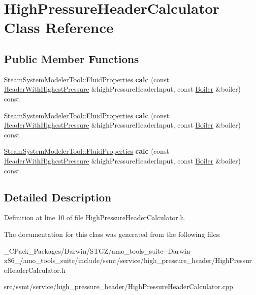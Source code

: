\hypertarget{class_high_pressure_header_calculator}{}\section{High\+Pressure\+Header\+Calculator Class Reference}
\label{class_high_pressure_header_calculator}
\subsection*{Public Member Functions}
\begin{DoxyCompactItemize}
\item 
\mbox{\label{class_high_pressure_header_calculator_a2929b3c87e8db8e1b43363b5234e5054}} 
\hyperlink{struct_steam_system_modeler_tool_1_1_fluid_properties}{Steam\+System\+Modeler\+Tool\+::\+Fluid\+Properties} {\bfseries calc} (const \hyperlink{class_header_with_highest_pressure}{Header\+With\+Highest\+Pressure} \&high\+Pressure\+Header\+Input, const \hyperlink{class_boiler}{Boiler} \&boiler) const
\item 
\mbox{\label{class_high_pressure_header_calculator_a2929b3c87e8db8e1b43363b5234e5054}} 
\hyperlink{struct_steam_system_modeler_tool_1_1_fluid_properties}{Steam\+System\+Modeler\+Tool\+::\+Fluid\+Properties} {\bfseries calc} (const \hyperlink{class_header_with_highest_pressure}{Header\+With\+Highest\+Pressure} \&high\+Pressure\+Header\+Input, const \hyperlink{class_boiler}{Boiler} \&boiler) const
\item 
\mbox{\label{class_high_pressure_header_calculator_a2929b3c87e8db8e1b43363b5234e5054}} 
\hyperlink{struct_steam_system_modeler_tool_1_1_fluid_properties}{Steam\+System\+Modeler\+Tool\+::\+Fluid\+Properties} {\bfseries calc} (const \hyperlink{class_header_with_highest_pressure}{Header\+With\+Highest\+Pressure} \&high\+Pressure\+Header\+Input, const \hyperlink{class_boiler}{Boiler} \&boiler) const
\end{DoxyCompactItemize}


\subsection{Detailed Description}


Definition at line 10 of file High\+Pressure\+Header\+Calculator.\+h.



The documentation for this class was generated from the following files\+:\begin{DoxyCompactItemize}
\item 
\+\_\+\+C\+Pack\+\_\+\+Packages/\+Darwin/\+S\+T\+G\+Z/amo\+\_\+tools\+\_\+suite-\/-\/\+Darwin-\/x86\+\_/amo\+\_\+tools\+\_\+suite/include/ssmt/service/high\+\_\+pressure\+\_\+header/High\+Pressure\+Header\+Calculator.\+h\item 
src/ssmt/service/high\+\_\+pressure\+\_\+header/High\+Pressure\+Header\+Calculator.\+cpp\end{DoxyCompactItemize}
